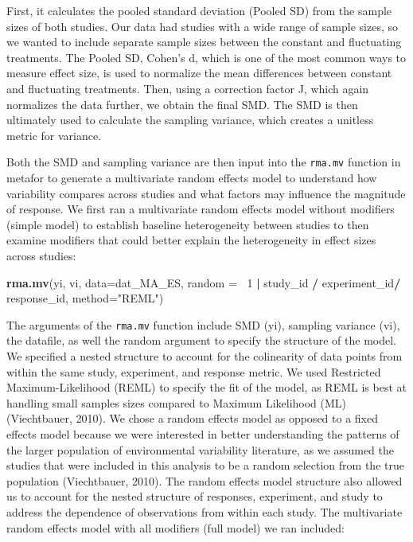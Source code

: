 \documentclass[12pt,twoside]{reedthesis}
\newenvironment{Shaded}{\begin{snugshade}}{\end{snugshade}}
\newcommand{\DataTypeTok}[1]{\textcolor[rgb]{0.13,0.29,0.53}{#1}}
\newcommand{\DecValTok}[1]{\textcolor[rgb]{0.00,0.00,0.81}{#1}}
\newcommand{\KeywordTok}[1]{\textcolor[rgb]{0.13,0.29,0.53}{\textbf{#1}}}
\newcommand{\NormalTok}[1]{#1}
\newcommand{\OperatorTok}[1]{\textcolor[rgb]{0.81,0.36,0.00}{\textbf{#1}}}
\newcommand{\StringTok}[1]{\textcolor[rgb]{0.31,0.60,0.02}{#1}}
\begin{document}
First, it calculates the pooled standard deviation (Pooled SD) from the sample sizes of both studies. Our data had studies with a wide range of sample sizes, so we wanted to include separate sample sizes between the constant and fluctuating treatments. The Pooled SD, Cohen's d, which is one of the most common ways to measure effect size, is used to normalize the mean differences between constant and fluctuating treatments. Then, using a correction factor J, which again normalizes the data further, we obtain the final SMD. The SMD is then ultimately used to calculate the sampling variance, which creates a unitless metric for variance.

Both the SMD and sampling variance are then input into the \texttt{rma.mv} function in metafor to generate a multivariate random effects model to understand how variability compares across studies and what factors may influence the magnitude of response. We first ran a multivariate random effects model without modifiers (simple model) to establish baseline heterogeneity between studies to then examine modifiers that could better explain the heterogeneity in effect sizes across studies:
\begin{Shaded}
\begin{Highlighting}[]
\KeywordTok{rma.mv}\NormalTok{(yi, vi, }
       \DataTypeTok{data=}\NormalTok{dat_MA_ES, }
       \DataTypeTok{random =} \OperatorTok{~}\DecValTok{1} \OperatorTok{|}\StringTok{ }\NormalTok{study_id }\OperatorTok{/}\StringTok{ }\NormalTok{experiment_id}\OperatorTok{/}\StringTok{ }\NormalTok{response_id, }
       \DataTypeTok{method=}\StringTok{"REML"}\NormalTok{) }
\end{Highlighting}
\end{Shaded}
The arguments of the \texttt{rma.mv} function include SMD (yi), sampling variance (vi), the datafile, as well the random argument to specify the structure of the model. We specified a nested structure to account for the colinearity of data points from within the same study, experiment, and response metric. We used Restricted Maximum-Likelihood (REML) to specify the fit of the model, as REML is best at handling small samples sizes compared to Maximum Likelihood (ML) (Viechtbauer, 2010). We chose a random effects model as opposed to a fixed effects model because we were interested in better understanding the patterns of the larger population of environmental variability literature, as we assumed the studies that were included in this analysis to be a random selection from the true population (Viechtbauer, 2010). The random effects model structure also allowed us to account for the nested structure of responses, experiment, and study to address the dependence of observations from within each study. The multivariate random effects model with all modifiers (full model) we ran included:
\end{document}
